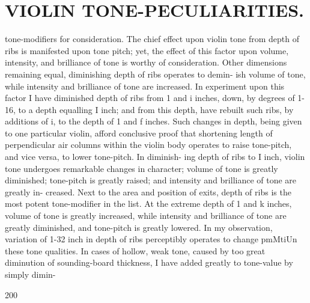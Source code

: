 \documentclass{article}
\begin{document}
\section*{VIOLIN TONE-PECULIARITIES.}
tone-modifiers for consideration. The chief effect upon violin tone from depth of ribs is manifested upon tone pitch; yet, the effect of this factor upon volume, intensity, and brilliance of tone is worthy of consideration. Other dimensions remaining equal, diminishing depth of ribs operates to demin- ish volume of tone, while intensity and brilliance of tone are increased. In experiment upon this factor I have diminished depth of ribs from 1 and i inches, down, by degrees of 1-16, to a depth equalling I inch; and from this depth, have rebuilt such ribs, by additions of i, to the depth of 1 and f inches. Such changes in depth, being given to one particular violin, afford conclusive proof that shortening length of perpendicular air columns within the violin body operates to raise tone-pitch, and vice versa, to lower tone-pitch. In diminish- ing depth of ribs to I inch, violin tone undergoes remarkable changes in character; volume of tone is greatly diminished; tone-pitch is greatly raised; and intensity and brilliance of tone are greatly in- creased. Next to the area and position of exits, depth of ribs is the most potent tone-modifier in the list. At the extreme depth of 1 and k inches, volume of tone is greatly increased, while intensity and brilliance of tone are greatly diminished, and tone-pitch is greatly lowered. In my observation, variation of 1-32 inch in depth of ribs perceptibly operates to change pmMtiUn these tone qualities. In cases of hollow, weak tone, caused by too great diminution of sounding-board thickness, I have added greatly to tone-value by simply dimin-

200
\end{document}
